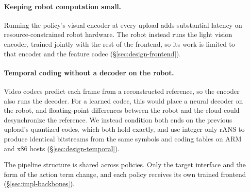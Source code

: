 \paragraph{Keeping robot computation small.}
Running the policy's visual encoder at every upload adds substantial
latency on resource-constrained robot hardware. The robot instead runs the
light vision encoder, trained jointly with the rest of the frontend, so
its work is limited to that encoder and the feature codec
(\S\ref{sec:design-frontend}).

\paragraph{Temporal coding without a decoder on the robot.}
Video codecs predict each frame from a reconstructed reference, so the
encoder also runs the decoder. For a learned codec, this would place a
neural decoder on the robot, and floating-point differences between the
robot and the cloud could desynchronize the reference. We instead
condition both ends on the previous upload's quantized codes, which both
hold exactly, and use
integer-only rANS to produce identical bitstreams from the same symbols
and coding tables on ARM and x86 hosts
(\S\ref{sec:design-temporal}).

The pipeline structure is shared across policies. Only the target
interface and the form of the action term change, and each policy
receives its own trained frontend (\S\ref{sec:impl-backbones}).
